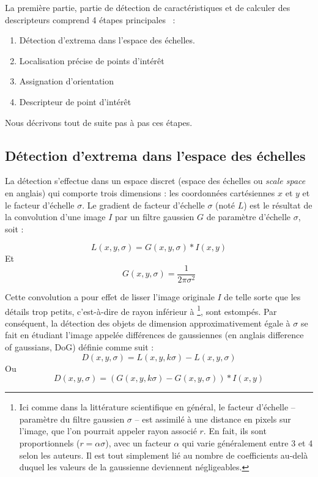 La première partie, partie de détection de caractéristiques et de calculer des descripteurs comprend 4 étapes principales \cite{low99, low04}~:
\begin{enumerate}
\item Détection d'extrema dans l'espace des échelles.
\item Localisation précise de points d'intérêt
\item Assignation d'orientation
\item Descripteur de point d'intérêt
\end{enumerate}
Nous décrivons tout de suite pas à pas ces étapes.

\subsection{Détection d'extrema dans l'espace des échelles}
La détection s'effectue dans un espace discret (espace des échelles ou \textit{scale space} en anglais) qui comporte trois dimensions : les coordonnées cartésiennes $x$ et $y$ et le facteur d'échelle $\sigma$. Le gradient de facteur d'échelle $\sigma$ (noté $L$) est le résultat de la convolution d'une image $I$ par un filtre gaussien $G$ de paramètre d'échelle $\sigma$, soit \cite{low04} :

\begin{equation}
L \left( x, y, \sigma \right) = G \left( x, y, \sigma \right) * I \left( x, y \right)
\end{equation}
Et
\[
G \left( x, y, \sigma \right) = \frac{1}{2\pi\sigma^2}
\]

Cette convolution a pour effet de lisser l'image originale $I$ de telle sorte que les détails trop petits, c'est-à-dire de rayon inférieur à \footnote{ Ici comme dans la littérature scientifique en général, le facteur d'échelle – paramètre du filtre gaussien $\sigma$ – est assimilé à une distance en pixels sur l'image, que l'on pourrait appeler rayon associé $r$. En fait, ils sont proportionnels ($r = \alpha \sigma$), avec un facteur $\alpha$ qui varie généralement entre 3 et 4 selon les auteurs. Il est tout simplement lié au nombre de coefficients au-delà duquel les valeurs de la gaussienne deviennent négligeables.}, sont estompés. Par conséquent, la détection des objets de dimension approximativement égale à $\sigma$ se fait en étudiant l'image appelée différences de gaussiennes (en anglais difference of gaussians, DoG) définie comme suit :
\begin{equation}
D \left( x, y, \sigma \right) = L \left( x, y, k\sigma \right) - L \left( x, y, \sigma \right)
\end{equation}
Ou
\[
D \left( x, y, \sigma \right) = (G \left( x, y, k\sigma \right) - G \left( x, y, \sigma \right)) * I \left( x, y \right)
\]

